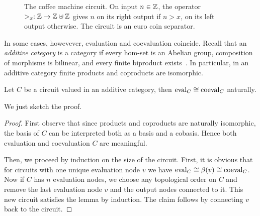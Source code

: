 \begin{figure}[!ht]
  \centering
  
  
  \caption{The coffee machine circuit. On input $n\in\mathbb{Z}$, the operator
    $>_x:\mathbb{Z}\rightarrow\mathbb{Z}\uplus\mathbb{Z}$ gives $n$ on its right output if $n>x$,
    on its left output otherwise. The circuit is an euro coin
    separator.}
  \label{fig:coffee}
\end{figure}

In some cases, howevever, evaluation and coevaluation coincide. Recall
that an \emph{additive category} is a category if every hom-set is an
Abelian group, composition of morphisms is bilinear, and every finite
biproduct exists~\cite[VIII.2]{mclane}. In particular, in an additive
category finite products and coproducts are isomorphic.

\ifafourps\pagebreak[2]\fi
\begin{lemma}
  \label{th:coeval}
  Let $C$ be a circuit valued in an additive category, then
  $\operatorname{eval}_C\cong\operatorname{coeval}_C$ naturally.
\end{lemma}
We just sketch the proof.
\begin{proof}
  First observe that since products and coproducts are naturally
  isomorphic, the basis of $C$ can be interpreted both as a basis and
  a cobasis. Hence both evaluation and coevaluation $C$ are
  meaningful.

  Then, we proceed by induction on the size of the circuit. First, it
  is obvious that for circuits with one unique evaluation node $v$ we
  have $\operatorname{eval}_C\cong\beta(v)\cong\operatorname{coeval}_C$. Now if $C$ has $n$
  evaluation nodes, we choose any topological order on $C$ and remove
  the last evaluation node $v$ and the output nodes connected to
  it. This new circuit satisfies the lemma by induction. The claim
  follows by connecting $v$ back to the circuit.
\end{proof}


